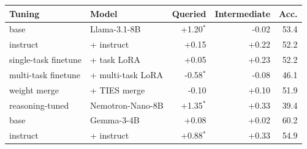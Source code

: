 \begin{tabular}{@{}llrrr@{}}
\toprule
Tuning & Model & Queried & Intermediate & Acc. \\
\midrule
base & Llama-3.1-8B & +1.20$^{*}$ & -0.02 & 53.4 \\
instruct & \quad + instruct & +0.15 & +0.22 & 52.2 \\
single-task finetune & \quad + task LoRA & +0.05 & +0.23 & 52.2 \\
multi-task finetune & \quad + multi-task LoRA & -0.58$^{*}$ & -0.08 & 46.1 \\
weight merge & \quad + TIES merge & -0.10 & +0.10 & 51.9 \\
reasoning-tuned & Nemotron-Nano-8B & +1.35$^{*}$ & +0.33 & 39.4 \\
\midrule
base & Gemma-3-4B & +0.08 & +0.02 & 60.2 \\
instruct & \quad + instruct & +0.88$^{*}$ & +0.33 & 54.9 \\
\bottomrule
\end{tabular}
